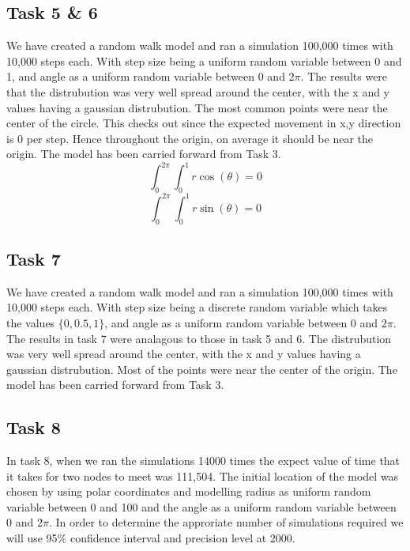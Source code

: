 \documentclass[a4paper, 11pt]{book} %
\begin{document}
\subsection*{Task 5 \& 6}
We have created a random walk model and ran a simulation 100,000 times with 10,000 steps each. With step size being a uniform random variable between 0 and 1, and angle as a uniform random variable between 0 and \(2 \pi\). The results were that the distrubution was very well spread around the center, with the x and y values having a gaussian distrubution. The most common points were near the center of the circle. This checks out since the expected movement in x,y direction is 0 per step. Hence throughout the origin, on average it should be near the origin.  The model has been carried forward from Task 3.
\[\int^{2\pi}_{0} \int^{1}_{0} r \cos (\theta) = 0\]
\[\int^{2\pi}_{0} \int^{1}_{0} r \sin (\theta) = 0\]


\subsection*{Task 7}
We have created a random walk model and ran a simulation 100,000 times with 10,000 steps each. With step size being a discrete random variable which takes the values $\{0,0.5,1\}$, and angle as a uniform random variable between 0 and \(2 \pi\). The results in task 7 were analagous to those in task 5 and 6. The distrubution was very well spread around the center, with the x and y values having a gaussian distrubution. Most of the points were near the center of the origin. The model has been carried forward from Task 3.
\subsection*{Task 8}

In task 8, when we ran the simulations 14000 times the expect value of time that it takes for two nodes to meet was 111,504. 
The initial location of the model was chosen by using polar coordinates and modelling radius as uniform random variable
between 0 and 100 and the angle as a uniform random variable between 0 and $2\pi$. In order to determine the approriate number of simulations
required we will use 95\%  confidence interval and precision level at 2000. \\
\end{document}
